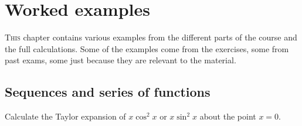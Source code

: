 \chapter{Worked examples}

\lettrine{T}{his} chapter contains various examples from the different parts of the course and the full calculations.
Some of the examples come from the exercises, some from past exams, some just because they are relevant to the material.

\section{Sequences and series of functions}

\begin{task}
    Calculate the Taylor expansion of
    \(x\cos^2 x\) or \(x\sin^2 x\)
    about the point \(x=0\).
\end{task}

